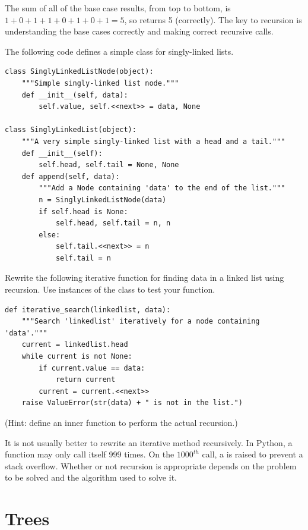 The sum of all of the base case results, from top to bottom, is $1 + 0 + 1 + 1 + 0 + 1 + 0 + 1 = 5$, so  returns 5 (correctly).
The key to recursion is understanding the base cases correctly and making correct recursive calls.

\begin{problem}
The following code defines a simple class for singly-linked lists.
\begin{lstlisting}
class SinglyLinkedListNode(object):
    """Simple singly-linked list node."""
    def __init__(self, data):
        self.value, self.<<next>> = data, None

class SinglyLinkedList(object):
    """A very simple singly-linked list with a head and a tail."""
    def __init__(self):
        self.head, self.tail = None, None
    def append(self, data):
        """Add a Node containing 'data' to the end of the list."""
        n = SinglyLinkedListNode(data)
        if self.head is None:
            self.head, self.tail = n, n
        else:
            self.tail.<<next>> = n
            self.tail = n
\end{lstlisting}
Rewrite the following iterative function for finding data in a linked list using recursion.
Use instances of the  class to test your function.
\begin{lstlisting}
def iterative_search(linkedlist, data):
    """Search 'linkedlist' iteratively for a node containing 'data'."""
	current = linkedlist.head
	while current is not None:
		if current.value == data:
			return current
		current = current.<<next>>
	raise ValueError(str(data) + " is not in the list.")
\end{lstlisting}
(Hint: define an inner function to perform the actual recursion.)
\end{problem}

\begin{warn}
It is not usually better to rewrite an iterative method recursively.
In Python, a function may only call itself 999 times.
On the $1000^{th}$ call, a  is raised to prevent a stack overflow.
Whether or not recursion is appropriate depends on the problem to be solved and the algorithm used to solve it.
\end{warn}

\section*{Trees}

